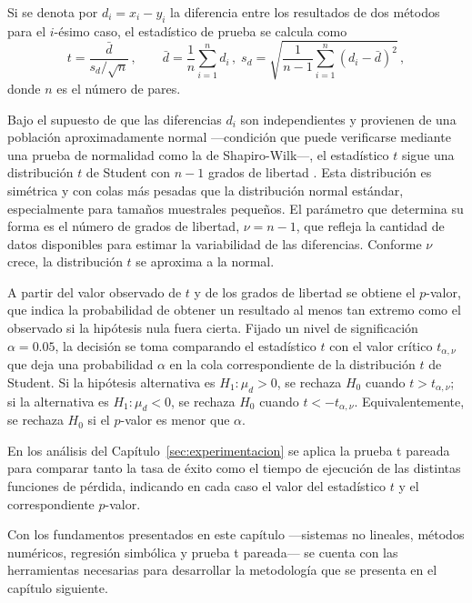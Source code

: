 Si se denota por \(d_i = x_i - y_i\) la diferencia entre los resultados de dos métodos para el \(i\)-ésimo caso, el estadístico de prueba se calcula como
\[
t = \frac{\bar{d}}{s_d / \sqrt{n}}\,, \qquad \bar{d} = \frac{1}{n}\sum_{i=1}^{n} d_i\,,\; s_d = \sqrt{\frac{1}{n-1}\sum_{i=1}^{n} (d_i - \bar{d})^2}\,,
\]
donde \(n\) es el número de pares.

Bajo el supuesto de que las diferencias \(d_i\) son independientes y provienen de una población aproximadamente normal —condición que puede verificarse mediante una prueba de normalidad como la de Shapiro-Wilk—, el estadístico \(t\) sigue una distribución \(t\) de Student con \(n-1\) grados de libertad \cite{montgomery2017applied}. Esta distribución es simétrica y con colas más pesadas que la distribución normal estándar, especialmente para tamaños muestrales pequeños. El parámetro que determina su forma es el número de grados de libertad, \(\nu = n-1\), que refleja la cantidad de datos disponibles para estimar la variabilidad de las diferencias. Conforme
\(\nu\) crece, la distribución \(t\) se aproxima a la normal.

A partir del valor observado de \(t\) y de los grados de libertad se obtiene el \(p\)-valor, que indica la probabilidad de obtener un resultado al menos tan extremo como el observado si la hipótesis nula fuera cierta. Fijado un nivel de significación \(\alpha = 0.05\), la decisión se toma comparando el estadístico \(t\) con el valor crítico
\(t_{\alpha, \nu}\) que deja una probabilidad \(\alpha\) en la cola
correspondiente de la distribución \(t\) de Student. Si la hipótesis alternativa es \(H_1 : \mu_d > 0\), se rechaza \(H_0\) cuando
\(t > t_{\alpha, \nu}\); si la alternativa es \(H_1 : \mu_d < 0\), se
rechaza \(H_0\) cuando \(t < -t_{\alpha, \nu}\). Equivalentemente, se rechaza \(H_0\) si el \(p\)-valor es menor que \(\alpha\).

En los análisis del Capítulo~\ref{sec:experimentacion} se aplica la prueba t pareada para comparar tanto la tasa de éxito como el tiempo de ejecución de las distintas funciones de pérdida, indicando en cada caso el valor del estadístico \(t\) y el correspondiente \(p\)-valor.

Con los fundamentos presentados en este capítulo —sistemas no lineales, métodos numéricos, regresión simbólica y prueba t pareada— se cuenta con las herramientas necesarias para desarrollar la metodología que se presenta en el capítulo siguiente.